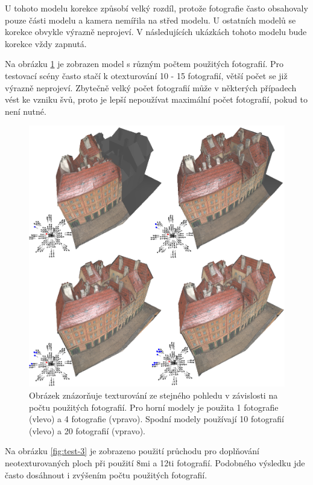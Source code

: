 \documentclass[11pt,twoside,a4paper]{book}
\begin{document}
U tohoto modelu korekce způsobí velký rozdíl, protože fotografie často obsahovaly pouze části modelu a kamera nemířila na střed modelu. U ostatních modelů se korekce obvykle výrazně neprojeví. V následujících ukázkách tohoto modelu bude korekce vždy zapnutá.

Na obrázku \ref{fig:test-2} je zobrazen model s různým počtem použitých fotografií. Pro testovací scény často stačí k otexturování 10 - 15 fotografií, větší počet se již výrazně neprojeví. Zbytečně velký počet fotografií může v některých případech vést ke vzniku švů, proto je lepší nepoužívat maximální počet fotografií, pokud to není nutné.

\begin{figure}[h!]
\begin{center}
\includegraphics[width=\textwidth]{figures/test-2}
\caption{Obrázek znázorňuje texturování ze stejného pohledu v závislosti na počtu použitých fotografií. Pro horní modely je použita 1 fotografie (vlevo) a 4 fotografie (vpravo). Spodní modely používají 10 fotografií (vlevo) a 20 fotografií (vpravo).}
\label{fig:test-2}
\end{center}
\end{figure}

Na  obrázku \ref{fig:test-3} je zobrazeno použití průchodu pro doplňování neotexturovaných ploch při použití 8mi a 12ti fotografií. Podobného výsledku jde často dosáhnout i zvýšením počtu použitých fotografií.
\end{document}
